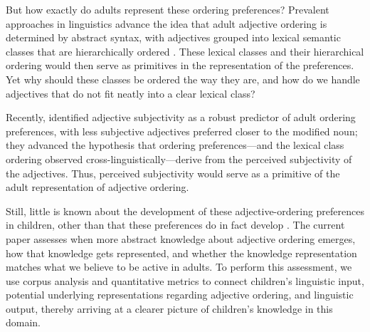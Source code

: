 \documentclass[10pt]{article}
\begin{document}
But how exactly do adults represent these ordering preferences?
Prevalent approaches in linguistics advance the idea that adult adjective ordering is determined by abstract syntax, with adjectives grouped into lexical semantic classes that are hierarchically ordered \citep{dixon1982,Cinque1994}. These lexical classes and their hierarchical ordering would then serve as primitives in the representation of the preferences.
Yet why should these classes be ordered the way they are, and how do we handle adjectives that do not fit neatly into a clear lexical class? 

  Recently, \cite{scontras2017subjectivity} identified adjective subjectivity as a robust predictor of adult ordering preferences, with less subjective adjectives preferred closer to the modified noun; they advanced the hypothesis that ordering preferences---and the lexical class ordering observed cross-linguistically---derive from the perceived subjectivity of the adjectives. Thus, perceived subjectivity would serve as a primitive of the adult representation of adjective ordering. %

Still, little is known about the development of these adjective-ordering preferences in children, other than that these preferences do in fact develop \citep{bever1970cognitive,martin1972preferred,hare1978development}. 
The current paper assesses {when} more abstract knowledge about adjective ordering emerges, how that knowledge gets represented, and whether the knowledge representation matches what we believe to be active in adults. To perform this assessment, we use corpus analysis and quantitative metrics to connect children's linguistic input, potential underlying representations regarding adjective ordering, and linguistic output, thereby arriving at a clearer picture of children's knowledge in this domain.
\end{document}
